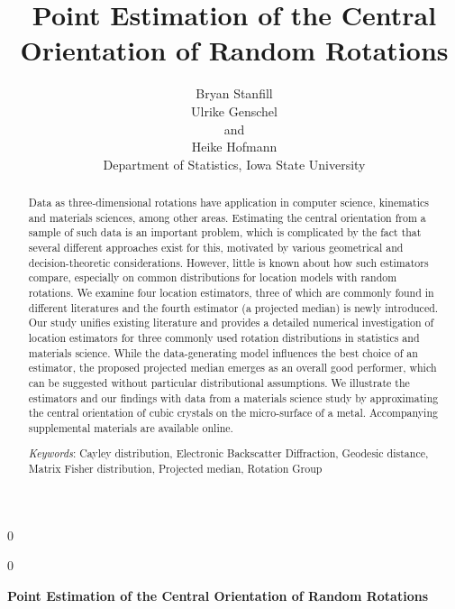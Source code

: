 \documentclass[12pt]{article}
\newcommand{\blind}{0}
\newcommand{\red}[1]{{\color{red} #1}}
\begin{document}
\def\spacingset#1{\renewcommand{\baselinestretch}%
{#1}\small\normalsize} \spacingset{1}

\blind
{
  \title{\bf Point Estimation of the Central Orientation of Random Rotations}
  \author{Bryan Stanfill\\
    Ulrike Genschel \\
    and\\
    Heike Hofmann\\
    Department of Statistics, Iowa State University\\}
  \maketitle
} \fi

\blind
{
  \bigskip
  \bigskip
  \bigskip
  \begin{center}
    {\LARGE\bf Point Estimation of the Central Orientation of Random Rotations}
\end{center}
  \medskip
} \fi



\bigskip
\begin{abstract}
Data as three-dimensional rotations have application in computer science, kinematics and materials sciences, among other areas.  Estimating the central orientation from a sample of such data is an important problem, which is complicated by the
fact that several different approaches exist for this,  motivated by various geometrical and decision-theoretic considerations. However, little is known about how such estimators compare, especially on common distributions for location models with random rotations.  We examine four location estimators, three of which are commonly found in different literatures and the
fourth estimator (a projected median) is newly introduced.  Our study unifies
existing literature and provides a detailed numerical investigation of location estimators for three commonly used rotation distributions in statistics and materials science.  While
the data-generating model influences the best choice of an estimator, the proposed projected median emerges as an overall good performer, which can be suggested
without particular distributional assumptions.  We illustrate the estimators 
and our findings with data from a materials science study by approximating the central orientation of cubic crystals on the micro-surface of a metal.
\red{Accompanying supplemental materials are available online.}


\noindent\textit{Keywords}: Cayley distribution, Electronic Backscatter Diffraction, Geodesic distance, Matrix Fisher distribution, Projected median,  Rotation Group \end{abstract}
\spacingset{1.45} %
\newpage







\clearpage

\clearpage

\end{document}
